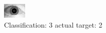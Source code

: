 \begin{figure}[h!]
\begin{center}
\includegraphics[width=0.60\columnwidth]{figures/ID1751_class_3_target_2.png}
\end{center}
\caption{ Classification: 3 actual target: 2}
\label{fig:ID1751_class_3_target_2}
\end{figure}
